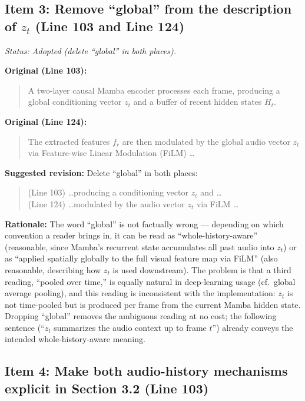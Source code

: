 \documentclass{article}
\begin{document}
\subsection*{Item 3: Remove ``global'' from the description of $z_t$ (Line 103 and Line 124)}

\textit{Status: Adopted (delete ``global'' in both places).}

\textbf{Original (Line 103):}
\begin{quote}
A two-layer causal Mamba encoder processes each frame, producing a global conditioning vector $z_t$ and a buffer of recent hidden states $H_t$.
\end{quote}

\textbf{Original (Line 124):}
\begin{quote}
The extracted features $f_r$ are then modulated by the global audio vector $z_t$ via Feature-wise Linear Modulation (FiLM) \ldots
\end{quote}

\textbf{Suggested revision:}
Delete ``global'' in both places:
\begin{quote}
(Line 103) \ldots producing a conditioning vector $z_t$ and \ldots\\
(Line 124) \ldots modulated by the audio vector $z_t$ via FiLM \ldots
\end{quote}

\textbf{Rationale:}
The word ``global'' is not factually wrong --- depending on which convention a reader brings in, it can be read as ``whole-history-aware'' (reasonable, since Mamba's recurrent state accumulates all past audio into $z_t$) or as ``applied spatially globally to the full visual feature map via FiLM'' (also reasonable, describing how $z_t$ is used downstream). The problem is that a third reading, ``pooled over time,'' is equally natural in deep-learning usage (cf.\ global average pooling), and this reading is inconsistent with the implementation: $z_t$ is not time-pooled but is produced per frame from the current Mamba hidden state. Dropping ``global'' removes the ambiguous reading at no cost; the following sentence (``$z_t$ summarizes the audio context up to frame $t$'') already conveys the intended whole-history-aware meaning.

\subsection*{Item 4: Make both audio-history mechanisms explicit in Section 3.2 (Line 103)}
\end{document}
